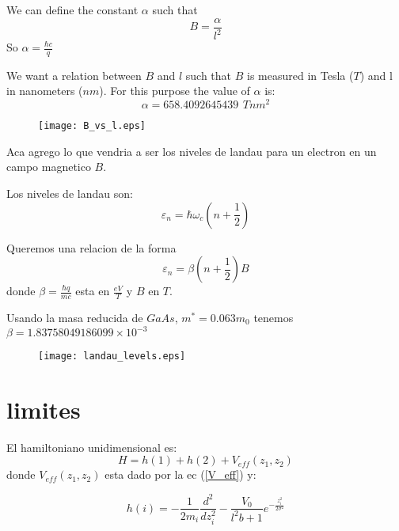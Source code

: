 \documentclass[a4paper,10pt]{article}
\begin{document}
We can define the constant $\alpha$ such that
\begin{equation}
B = \frac{\alpha}{l^2}
\end{equation}
\noindent
So $\alpha = \frac{\hbar c}{q}$

We want a relation between $B$ and $l$ such that $B$ is measured in Tesla ($T$) and
l in nanometers ($nm$). For this purpose the value of $\alpha$ is:
\begin{equation}
\alpha = 658.4092645439 \, \ T nm^2
\end{equation}

\begin{figure}[h]
\begin{center}
 \texttt{[image: B\_vs\_l.eps]}
\end{center}
\end{figure}

Aca agrego lo que vendria a ser los niveles de landau para un electron en un campo magnetico $B$.

Los niveles de landau son:
\begin{equation}
\varepsilon_n = \hbar \omega_c \left(n + \frac{1}{2}\right)
\end{equation}

Queremos una relacion de la forma
\begin{equation}
\varepsilon_n = \beta \left(n+\frac{1}{2}\right) B
\end{equation}
\noindent
donde $\beta = \frac{\hbar q}{m c}$ esta en $\frac{eV}{T}$ y $B$ en $T$.

Usando la masa reducida de $GaAs$, $m^* = 0.063 m_0$ tenemos $\beta = 1.83758049186099\times 10^{-3}$

\begin{figure}[h]
\begin{center}
 \texttt{[image: landau\_levels.eps]}
\end{center}
\end{figure}

\section{limites}
El hamiltoniano unidimensional es:
\begin{equation}
\label{H_unidimensional}
H = h(1)+h(2)+V_{eff}(z_1,z_2)
\end{equation}
donde $V_{eff}(z_1,z_2)$ esta dado por la ec (\ref{V_eff}) y:

\begin{equation}
\label{h_1particula}
h(i) = -\frac{1}{2m_i}\frac{d^2}{dz_i^2}-\frac{V_0}{l^2 b+1}e^{-\frac{z_i^2}{2\sigma^2}}
\end{equation}
\end{document}
